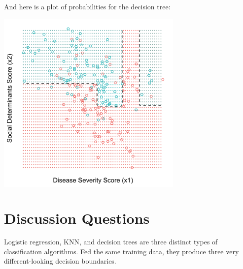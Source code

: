 \noindent And here is a plot of probabilities for the decision tree:
\begin{center}
\includegraphics[width=0.68\textwidth]{img/esl-decision-tree-prob.png}
\end{center}


\section{Discussion Questions}

Logistic regression, KNN, and decision trees are three distinct types of classification algorithms. Fed the same training data, they produce three very different-looking decision boundaries.

